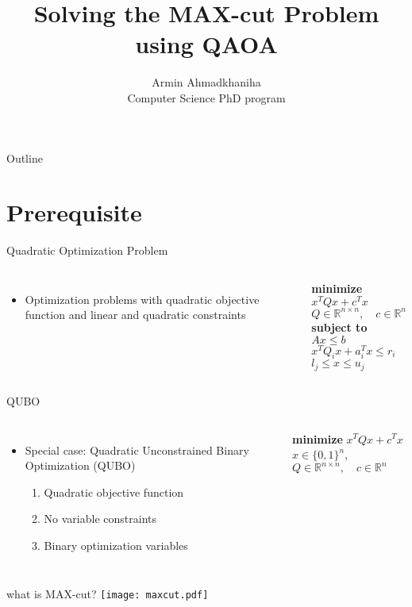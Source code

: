 \documentclass{beamer}
\title{Solving the MAX-cut Problem using QAOA}
\author{Armin Ahmadkhaniha\\Computer Science PhD program}
\begin{document}
\begin{frame}
    \titlepage
\end{frame}

\begin{frame}{Outline}
    \tableofcontents
\end{frame}

\section{Prerequisite}
\begin{frame}{Quadratic Optimization Problem}
    \begin{columns}
        \begin{itemize}
            \item Optimization problems with quadratic objective function and linear and quadratic constraints
            
            
        \end{itemize}
   
    
    \textbf{minimize}  $x^T Q x + c^T x$ \\
    \hspace*{20pt} $Q \in \mathbb{R}^{n \times n}, \quad c \in \mathbb{R}^n$ \\
    \textbf{subject to} \\
     $Ax \leq b$ \\
     $x^T Q_i x + a_i^T x \leq r_i$ \\
     $l_j \leq x \leq u_j$
    \end{columns}
\end{frame}
\begin{frame}{QUBO}
    \begin{columns}
    \begin{itemize}
        \item Special case: Quadratic Unconstrained Binary Optimization (QUBO)
        \begin{enumerate}
        \item Quadratic objective function
        \item No variable constraints
        \item Binary optimization variables
    
        \end{enumerate}
        \end{itemize}

        \textbf{minimize}  $x^T Q x + c^T x$ \\
        $x \in \{0,1\}^n$, $Q \in \mathbb{R}^{n \times n}, \quad c \in \mathbb{R}^n$ \\
       
    
    \end{columns}
\end{frame}
\begin{frame}{what is MAX-cut?}
   \centering
    \texttt{[image: maxcut.pdf]}
\end{frame}
\end{document}

